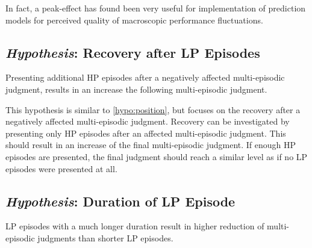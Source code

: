 {In fact, a peak-effect has found been very useful for implementation of prediction models for perceived quality of macroscopic performance fluctuations.

\subsection{\emph{Hypothesis}: Recovery after \acs{LP} Episodes}
\begin{hypothesis}\label{hypo:recovery}
Presenting additional \ac{HP} episodes after a negatively affected multi-episodic judgment, results in an increase the following multi-episodic judgment.
\end{hypothesis}

This hypothesis is similar to \autoref{hypo:position}, but focuses on the recovery after a negatively affected multi-episodic judgment.
Recovery can be investigated by presenting only \ac{HP} episodes after an affected multi-episodic judgment.
This should result in an increase of the final multi-episodic judgment.
If enough \ac{HP} episodes are presented, the final judgment should reach a similar level as if no \ac{LP} episodes were presented at all.

\subsection{\emph{Hypothesis}: Duration of \acs{LP} Episode}
\begin{hypothesis}\label{hypo:duration}
\ac{LP} episodes with a much longer duration result in higher reduction of multi-episodic judgments than shorter \ac{LP} episodes.
\end{hypothesis}

}
